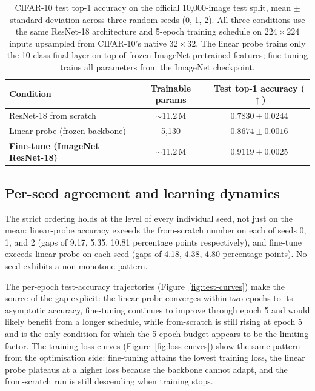 \documentclass[11pt,twocolumn]{article}
\begin{document}
\begin{table}[!t]
\centering
\begin{tabular}{lcc}
\toprule
Condition & Trainable params & Test top-1 accuracy ($\uparrow$) \\
\midrule
ResNet-18 from scratch                       & $\sim$11.2\,M & $0.7830 \pm 0.0244$ \\
Linear probe (frozen backbone)               & 5{,}130        & $0.8674 \pm 0.0016$ \\
\textbf{Fine-tune (ImageNet ResNet-18)}      & $\sim$11.2\,M & $\mathbf{0.9119 \pm 0.0025}$ \\
\bottomrule
\end{tabular}
\caption{CIFAR-10 test top-1 accuracy on the official 10{,}000-image
test split, mean $\pm$ standard deviation across three random seeds
(0, 1, 2). All three conditions use the same ResNet-18 architecture
and 5-epoch training schedule on $224{\times}224$ inputs upsampled
from CIFAR-10's native $32{\times}32$. The linear probe trains only
the 10-class final layer on top of frozen ImageNet-pretrained
features; fine-tuning trains all parameters from the ImageNet
checkpoint.}
\label{tab:transfer-main}
\end{table}

\subsection{Per-seed agreement and learning dynamics}

The strict ordering holds at the level of every individual seed, not
just on the mean: linear-probe accuracy exceeds the from-scratch
number on each of seeds 0, 1, and 2 (gaps of 9.17, 5.35, 10.81
percentage points respectively), and fine-tune exceeds linear probe
on each seed (gaps of 4.18, 4.38, 4.80
percentage points). No seed exhibits a non-monotone pattern.

The per-epoch test-accuracy trajectories
(Figure~\ref{fig:test-curves}) make the source of the gap explicit:
the linear probe converges within two epochs to its asymptotic
accuracy, fine-tuning continues to improve through epoch 5 and would
likely benefit from a longer schedule, while from-scratch is still
rising at epoch 5 and is the only condition for which the 5-epoch
budget appears to be the limiting factor. The training-loss curves
(Figure~\ref{fig:loss-curves}) show the same pattern from the
optimisation side: fine-tuning attains the lowest training loss, the
linear probe plateaus at a higher loss because the backbone cannot
adapt, and the from-scratch run is still descending when training
stops.
\end{document}
